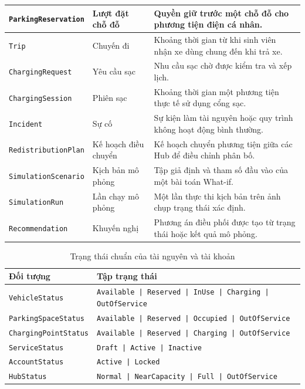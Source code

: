 \begin{longtable}{|L{44mm}|L{34mm}|L{62mm}|}
  \hline
  \texttt{ParkingReservation} & Lượt đặt chỗ đỗ & Quyền giữ trước một chỗ đỗ cho phương tiện điện cá nhân.\\
  \hline
  \texttt{Trip} & Chuyến đi & Khoảng thời gian từ khi sinh viên nhận xe dùng chung đến khi trả xe.\\
  \hline
  \texttt{ChargingRequest} & Yêu cầu sạc & Nhu cầu sạc chờ được kiểm tra và xếp lịch.\\
  \hline
  \texttt{ChargingSession} & Phiên sạc & Khoảng thời gian một phương tiện thực tế sử dụng cổng sạc.\\
  \hline
  \texttt{Incident} & Sự cố & Sự kiện làm tài nguyên hoặc quy trình không hoạt động bình thường.\\
  \hline
  \texttt{RedistributionPlan} & Kế hoạch điều chuyển & Kế hoạch chuyển phương tiện giữa các Hub để điều chỉnh phân bố.\\
  \hline
  \texttt{SimulationScenario} & Kịch bản mô phỏng & Tập giả định và tham số đầu vào của một bài toán What-if.\\
  \hline
  \texttt{SimulationRun} & Lần chạy mô phỏng & Một lần thực thi kịch bản trên ảnh chụp trạng thái xác định.\\
  \hline
  \texttt{Recommendation} & Khuyến nghị & Phương án điều phối được tạo từ trạng thái hoặc kết quả mô phỏng.\\
  \hline
\end{longtable}
\endgroup

\begin{table}[H]
  \centering
  \caption{Trạng thái chuẩn của tài nguyên và tài khoản}
  \label{tab:resource-statuses}
  \small
  \begin{tabularx}{\textwidth}{|L{47mm}|Y|}
    \hline
    \centering\arraybackslash\textbf{Đối tượng} & \centering\arraybackslash\textbf{Tập trạng thái}\\
    \hline
    \texttt{VehicleStatus} & \texttt{Available | Reserved | InUse | Charging | OutOfService}\\
    \hline
    \texttt{ParkingSpaceStatus} & \texttt{Available | Reserved | Occupied | OutOfService}\\
    \hline
    \texttt{ChargingPointStatus} & \texttt{Available | Reserved | Charging | OutOfService}\\
    \hline
    \texttt{ServiceStatus} & \texttt{Draft | Active | Inactive}\\
    \hline
    \texttt{AccountStatus} & \texttt{Active | Locked}\\
    \hline
    \texttt{HubStatus} & \texttt{Normal | NearCapacity | Full | OutOfService}\\
    \hline
  \end{tabularx}
\end{table}

